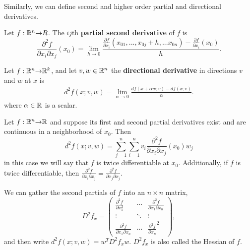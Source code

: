 Similarly, we can define second and higher order partial and
directional derivatives.
\begin{definition}
  Let $f:\mathbb{R}^n {\rightarrow} R$. The $ij$th \textbf{partial second derivative} of $f$
  is 
  \[ \frac{\partial^2 f}{\partial x_i \partial x_j} (x_0) = \lim_{h \to 0}
  \frac{\frac{\partial f}{\partial x_i} (x_{01},...,x_{0j}+h, ... x_{0n}) -
    \frac{\partial f}{\partial x_i}(x_0) }{h}. \] 
\end{definition}
\begin{definition}
  Let $f: \mathbb{R}^n {\rightarrow} \mathbb{R}^k$, and let $v, w \in \mathbb{R}^n$ the \textbf{directional
    derivative} in directions $v$ and $w$ at $x$ is
  \begin{align*}
    d^2f(x;v,w) = \lim_{\alpha \to 0} \frac{df(x + \alpha w;v) - df(x;v)}{\alpha}.
  \end{align*}  
  where $\alpha \in \mathbb{R}$ is a scalar.
\end{definition}
\begin{theorem}\label{thm:pddiff2}
  Let $f:\mathbb{R}^n {\rightarrow} \mathbb{R}$ and suppose its first and second partial
  derivatives exist and are continuous in a neighborhood of
  $x_0$. Then
  \[ d^2f(x;v,w) = \sum_{j=1}^n \sum_{i=1}^n v_i \frac{\partial^2
    f}{\partial x_i \partial x_j}
  (x_0) w_j \]
  in this case we will say that $f$ is twice differentiable at $x_0$. 
  Additionally, if $f$ is twice differentiable, then $\frac{\partial^2
    f}{\partial x_i \partial x_j} = \frac{\partial^2
    f}{\partial x_j \partial x_j}$.
\end{theorem}
We can gather the second partials of $f$ into an $n \times n$ matrix,
\[ D^2 f_{x} = \begin{pmatrix} \frac{\partial ^2 f}{\partial x_1^2}
  & \cdots & \frac{\partial^2 f }{\partial x_1\partial x_n} \\
  \vdots & \ddots & \vdots \\
  \frac{\partial^2 f}{\partial x_1\partial x_n} & \cdots &
  \frac{\partial^2 f}{\partial x_n}^2 \end{pmatrix},
\]
and then write $d^2f(x;v,w) = w^T D^2 f_x w$. $D^2 f_x$ is also called
the Hessian of $f$.

\clearpage




